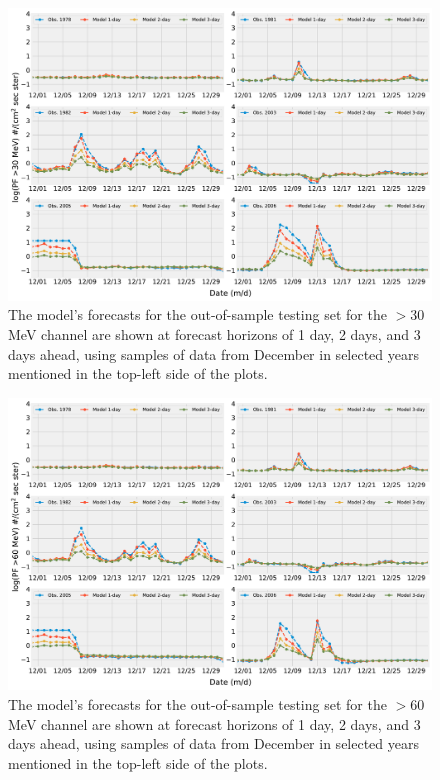 \begin{figure}[htp]
	\centering
    \includegraphics[width=\textwidth]{chapter4/figs/log_pf30/examples_30_tstset.pdf}
    \caption{The model's forecasts for the out-of-sample testing set for the $>$30 MeV channel are shown at forecast horizons of 1 day, 2 days, and 3 days ahead, using samples of data from December in selected years mentioned in the top-left side of the plots.}
\label{fig_examples_pf30_tstset}
\end{figure}

\begin{figure}[htp]
	\centering
    \includegraphics[width=\textwidth]{chapter4/figs/log_pf60/examples_60_tstset.pdf}
    \caption{The model's forecasts for the out-of-sample testing set for the $>$60 MeV channel are shown at forecast horizons of 1 day, 2 days, and 3 days ahead, using samples of data from December in selected years mentioned in the top-left side of the plots.}
\label{fig_examples_pf60_tstset}
\end{figure}

